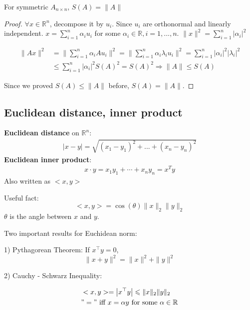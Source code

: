 \documentclass[11pt]{elegantbook}
\begin{document}
\begin{proposition}
    For symmetric $A_{n\times n}$, $S(A)= \|A\|$
\end{proposition}
\begin{proof}
\quad

$\forall x\in \mathbb{R}^n$, decompose it by $u_i$.
Since $u_i$ are orthonormal and linearly independent. $x=\sum_{i=1}^n\alpha_i u_i$ for some $\alpha_i\in \mathbb{R},i=1,...,n$. $\|x\|^2=\sum_{i=1}^n|\alpha_i|^2$

\begin{equation}
    \begin{aligned}
        \|Ax\|^2&=\|\sum_{i=1}^n\alpha_i A u_i\|^2=\|\sum_{i=1}^n\alpha_i \lambda_i u_i\|^2=\sum_{i=1}^n|\alpha_i|^2|\lambda_i|^2\\
        &\leq \sum_{i=1}^n|\alpha_i|^2S(A)^2=S(A)^2 \Rightarrow	\|A\|\leq S(A)
    \end{aligned}
    \nonumber
\end{equation}

Since we proved $S(A)\leq \|A\|$ before, $S(A)=\|A\|$.
\end{proof}


\subsection{Euclidean distance, inner product}
\textbf{Euclidean distance} on $\mathbb{R}^n$:
\begin{equation}
    \begin{aligned}
        |x-y|=\sqrt{(x_1-y_1)^2+...+(x_n-y_n)^2}
    \end{aligned}
    \nonumber
\end{equation}
\textbf{Euclidean inner product}:
\begin{equation}
    \begin{aligned}
        x\cdot y=x_1y_1+\cdots +x_ny_n=x^Ty
    \end{aligned}
    \nonumber
\end{equation}
Also written as $<x,y>$

Useful fact: $$<x,y>=\cos(\theta)\|x\|_2\|y\|_2$$
$\theta$ is the angle between $x$ and $y$.

Two important results for Euchidean norm:

1) Pythagorean Theorem: If $x^{\top} y=0$,
\[ \|x+y\|^{2}=\|x\|^{2}+\|y\|^{2} \]

2) Cauchy - Schwarz Inequality:

$$
\begin{aligned}
&<x,y>=\left|x^{\top} y\right| \leqslant\|x\|_2\|y\|_2 \\
&"=" \text { iff } x=\alpha y \text { for some } \alpha \in \mathbb{R}
\end{aligned}
$$
\end{document}
